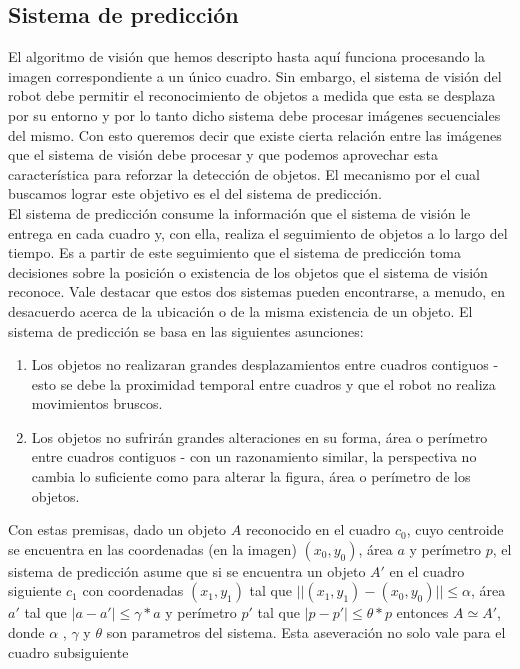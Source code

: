 	\subsection{Sistema de predicción}
	El algoritmo de visión que hemos descripto hasta aquí funciona 
	procesando la imagen correspondiente a un único cuadro. Sin embargo, 
	el sistema de visión del robot debe permitir el reconocimiento de 
	objetos a medida que esta se desplaza por su entorno y por lo tanto 
	dicho sistema debe procesar imágenes secuenciales del mismo. Con 
	esto queremos decir que existe cierta relación entre las imágenes 
	que el sistema de visión debe procesar y que podemos aprovechar esta 
	característica para reforzar la detección de objetos.  El mecanismo por el cual buscamos lograr este objetivo es el del sistema de predicción.\\
\indent 	El sistema de predicción consume la información que el 
sistema de visión le entrega en cada cuadro y, con ella, realiza el 
seguimiento de objetos a lo largo del tiempo. Es a partir de este 
seguimiento que el sistema de predicción toma decisiones sobre la 
posición o existencia de los objetos que el sistema de visión 
reconoce. Vale destacar que estos dos sistemas pueden encontrarse, a 
menudo, en desacuerdo acerca de la ubicación o de la misma existencia 
de un objeto.  El sistema de predicción se basa en las siguientes asunciones:
\begin{enumerate}
\item{ Los objetos no realizaran grandes desplazamientos entre cuadros contiguos - esto se debe la proximidad temporal entre cuadros y que el robot no realiza movimientos bruscos.}
\item{ Los objetos no sufrirán grandes alteraciones en su forma, área o perímetro entre cuadros contiguos - con un razonamiento similar, la perspectiva no cambia lo suficiente como para alterar la figura, área o perímetro de los objetos.}
\end{enumerate} 
Con estas premisas, dado un objeto $A$ reconocido en el cuadro $c_0$, 
cuyo centroide se encuentra en las coordenadas (en la imagen) $(x_0,y_0)$, área $a$ y perímetro $p$, 
el sistema de predicción asume que si se encuentra un objeto $A'$ en 
el cuadro siguiente $c_1$ con coordenadas $(x_1, y_1)$ tal que 
$||(x_1,y_1) - (x_0,y_0)||\leq \alpha$, área $a'$ tal que $|a-a'| \leq 
\gamma *a$ y perímetro $p'$ tal que $|p-p'|\leq \theta*p$ entonces $A 
\simeq A'$, donde $\alpha$ , $\gamma$ y $\theta$ son parametros del 
sistema. Esta aseveración no solo vale para el cuadro subsiguiente 
